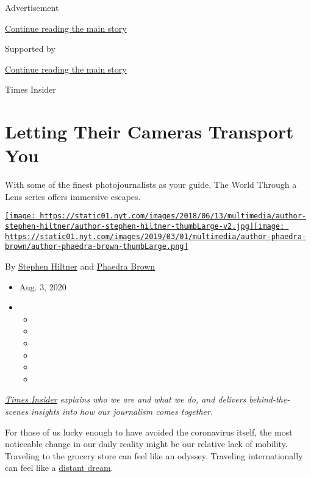 Advertisement

\protect\hyperlink{after-top}{Continue reading the main story}

Supported by

\protect\hyperlink{after-sponsor}{Continue reading the main story}

Times Insider

\hypertarget{letting-their-cameras-transport-you}{%
\section{Letting Their Cameras Transport
You}\label{letting-their-cameras-transport-you}}

With some of the finest photojournalists as your guide, The World
Through a Lens series offers immersive escapes.

\href{https://www.nytimes.com/by/stephen-hiltner}{\texttt{[image: https://static01.nyt.com/images/2018/06/13/multimedia/author-stephen-hiltner/author-stephen-hiltner-thumbLarge-v2.jpg]}}\href{https://www.nytimes.com/by/phaedra-brown}{\texttt{[image: https://static01.nyt.com/images/2019/03/01/multimedia/author-phaedra-brown/author-phaedra-brown-thumbLarge.png]}}

By \href{https://www.nytimes.com/by/stephen-hiltner}{Stephen Hiltner}
and \href{https://www.nytimes.com/by/phaedra-brown}{Phaedra Brown}

\begin{itemize}
\item
  Aug. 3, 2020
\item
  \begin{itemize}
  \item
  \item
  \item
  \item
  \item
  \item
  \end{itemize}
\end{itemize}

\href{https://www.nytimes.com/series/times-insider}{\emph{Times
Insider}} \emph{explains who we are and what we do, and delivers
behind-the-scenes insights into how our journalism comes together.}

For those of us lucky enough to have avoided the coronavirus itself, the
most noticeable change in our daily reality might be our relative lack
of mobility. Traveling to the grocery store can feel like an odyssey.
Traveling internationally can feel like a
\href{https://www.nytimes.com/2020/07/28/travel/future-travel-bucket-list-coronavirus.html}{distant
dream}.

